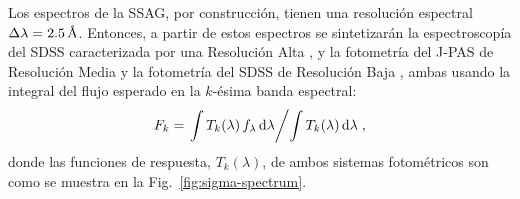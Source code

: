 Los espectros de la SSAG, por construcción, tienen una resolución espectral
$\Delta\lambda=\unit[2.5]{\AA}$. Entonces, a partir de estos espectros se sintetizarán la
espectroscopía del SDSS caracterizada por una Resolución Alta \citep[RA:
$\Delta\lambda\sim3\,\text{\AA}$][]{Strauss2002}, y la fotometría del J-PAS de Resolución Media
\citep[RM: $\Delta\lambda=100\,\text{\AA}$][]{Marin-Franch2015} y la fotometría del SDSS de
Resolución Baja \citep[RB: $\Delta\lambda\sim1000\,{\AA}$][]{Doi2010}, ambas usando la integral del
flujo esperado en la $k$-ésima banda espectral:
%
\begin{equation}\label{ec:flujo-esperado}
F_k = \left.\int T_k(\lambda)\,f_\lambda\,\text{d}\lambda\middle/\int T_k(\lambda)\,\text{d}\lambda\right.,
\end{equation}
%
donde las funciones de respuesta, $T_k(\lambda)$, de ambos sistemas fotométricos son como se muestra
en la Fig.~\ref{fig:sigma-spectrum}.


